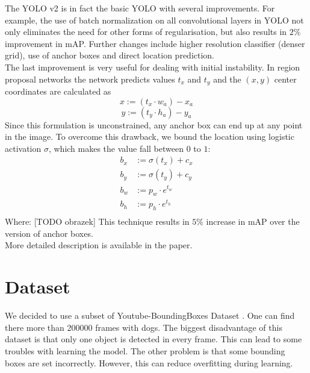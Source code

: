 \documentclass{article}
\begin{document}
The YOLO v2 is in fact the basic YOLO with several improvements. For example, the use of batch normalization on all convolutional layers in YOLO not only eliminates the need for other forms of regularisation, but also results in $2\%$ improvement in mAP. Further changes include higher resolution classifier (denser grid), use of anchor boxes and direct location prediction. \\
The last improvement is very useful for dealing with initial instability. In region proposal networks the network predicts values $t_x$ and $t_y$ and the $(x,y)$ center coordinates are calculated as
$$ x := (t_x \cdot w_a)-x_a $$
$$ y := (t_y \cdot h_a)-y_a $$
Since this formulation is unconstrained, any anchor box can end up at any point in the image. To overcome this drawback, we bound the location using logistic activation $\sigma$, which makes the value fall between $0$ to $1$:
\begin{equation}
\begin{aligned}
b_x &:= \sigma(t_x) + c_x \\
b_y &:= \sigma(t_y) + c_y \\
b_w &:= p_w \cdot e^{t_w} \\
b_h &:= p_h \cdot e^{t_h} \\
\end{aligned}
\end{equation}
Where: [TODO obrazek]
This technique results in $5\%$ increase in mAP over the version of anchor boxes.
\\ More detailed description is available in the paper.

\section*{Dataset}
We decided to use a subset of Youtube-BoundingBoxes Dataset \cite{youtube-bb}. One can find there more than 200000 frames with dogs. The biggest disadvantage of this dataset is that only one object is detected in every frame. This can lead to some troubles with learning the model. The other problem is that some bounding boxes are set incorrectly. However, this can reduce overfitting during learning.
\end{document}
